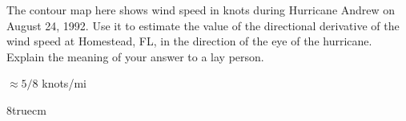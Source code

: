 \begin{exercises}
\begin{exercise} The contour map here shows wind speed in knots during Hurricane
Andrew on August 24, 1992.  Use it to estimate the value of the directional
derivative of the wind speed at Homestead, FL, in the direction of the eye
of the hurricane.  Explain the meaning of your answer to a lay person.
\begin{answer} $\approx 5/8$ knots/mi
\end{answer}\end{exercise}

\centerline{\epsfxsize8truecm}


\end{exercises}
